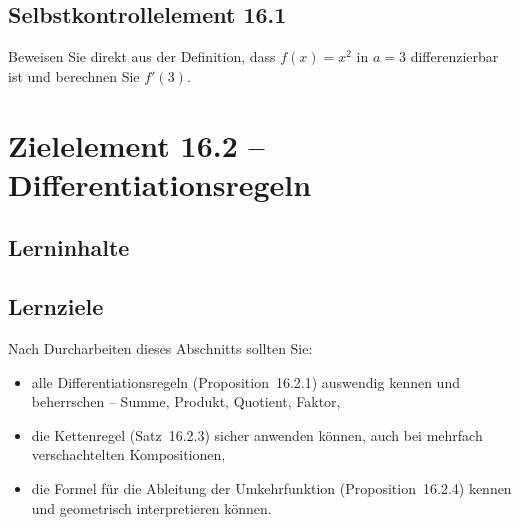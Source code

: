 \documentclass[a4paper,12pt]{article}
\begin{document}
\subsection*{Selbstkontrollelement 16.1}

Beweisen Sie direkt aus der Definition, dass $f(x) = x^2$ in $a = 3$ differenzierbar
ist und berechnen Sie $f'(3)$.

\newpage

\section*{Zielelement 16.2 -- Differentiationsregeln}

\subsection*{Lerninhalte}

\begin{center}
\end{center}

\subsection*{Lernziele}

Nach Durcharbeiten dieses Abschnitts sollten Sie:
\begin{itemize}
  \item alle Differentiationsregeln (Proposition~16.2.1) auswendig kennen und
        beherrschen -- Summe, Produkt, Quotient, Faktor,
  \item die Kettenregel (Satz~16.2.3) sicher anwenden können, auch bei mehrfach
        verschachtelten Kompositionen,
  \item die Formel für die Ableitung der Umkehrfunktion (Proposition~16.2.4) kennen
        und geometrisch interpretieren können.
\end{itemize}
\end{document}
